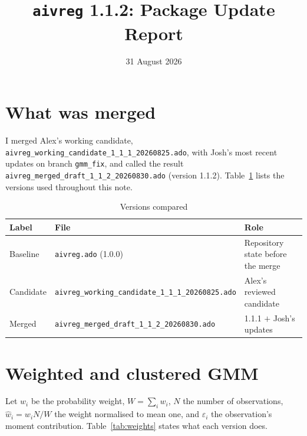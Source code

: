 \documentclass[11pt]{article}
\title{\texttt{aivreg} 1.1.2: Package Update Report}
\date{31 August 2026}
\newcommand{\code}[1]{\texttt{\small #1}}
\begin{document}
\maketitle

\section{What was merged}

I merged Alex's working candidate, \code{aivreg\_working\_candidate\_1\_1\_1\_20260825.ado},
with Josh's most recent updates on branch \code{gmm\_fix}, and called the result
\code{aivreg\_merged\_draft\_1\_1\_2\_20260830.ado} (version 1.1.2).
Table~\ref{tab:files} lists the versions used throughout this note.

\begin{table}[h]
\centering
\caption{Versions compared}
\label{tab:files}
\begin{tabular}{lll}
\toprule
Label & File & Role \\
\midrule
Baseline  & \code{aivreg.ado} (1.0.0)                        & Repository state before the merge \\
Candidate & \code{aivreg\_working\_candidate\_1\_1\_1\_20260825.ado} & Alex's reviewed candidate \\
Merged    & \code{aivreg\_merged\_draft\_1\_1\_2\_20260830.ado}     & 1.1.1 $+$ Josh's updates \\
\bottomrule
\end{tabular}
\end{table}


\section{Weighted and clustered GMM}
\label{sec:weights}

Let $w_i$ be the probability weight, $W=\sum_i w_i$, $N$ the number of observations,
$\hat{w}_i = w_i N / W$ the weight normalised to mean one, and $\varepsilon_i$ the
observation's moment contribution. Table~\ref{tab:weights} states what each version does.
\end{document}

